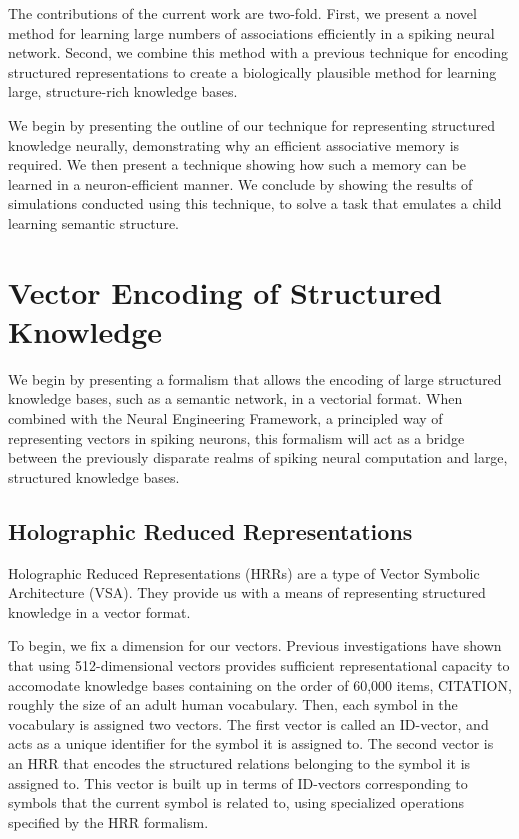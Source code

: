 \documentclass[10pt,letterpaper]{article}
\begin{document}
The contributions of the current work are two-fold. First, we present a novel method for learning large numbers of associations efficiently in a spiking neural network. Second, we combine this method with a previous technique for encoding structured representations to create a biologically plausible method for learning large, structure-rich knowledge bases.

We begin by presenting the outline of our technique for representing structured knowledge neurally, demonstrating why an efficient associative memory is required. We then present a technique showing how such a memory can be learned in a neuron-efficient manner. We conclude by showing the results of simulations conducted using this technique, to solve a task that emulates a child learning semantic structure.

\section{Vector Encoding of Structured Knowledge}
We begin by presenting a formalism that allows the encoding of large structured knowledge bases, such as a semantic network, in a vectorial format. When combined with the Neural Engineering Framework, a principled way of representing vectors in spiking neurons, this formalism will act as a bridge between the previously disparate realms of spiking neural computation and large, structured knowledge bases.

\subsection{Holographic Reduced Representations}
Holographic Reduced Representations (HRRs) are a type of Vector Symbolic Architecture (VSA). They provide us with a means of representing structured knowledge in a vector format. 

To begin, we fix a dimension for our vectors. Previous investigations have shown that using 512-dimensional vectors provides sufficient representational capacity to accomodate knowledge bases containing on the order of 60,000 items,  CITATION, roughly the size of an adult human vocabulary. Then, each symbol in the vocabulary is assigned two vectors. The first vector is called an ID-vector, and acts as a unique identifier for the symbol it is assigned to. The second vector is an HRR that encodes the structured relations belonging to the symbol it is assigned to. This vector is built up in terms of ID-vectors corresponding to symbols that the current symbol is related to, using specialized operations specified by the HRR formalism.
\end{document}
